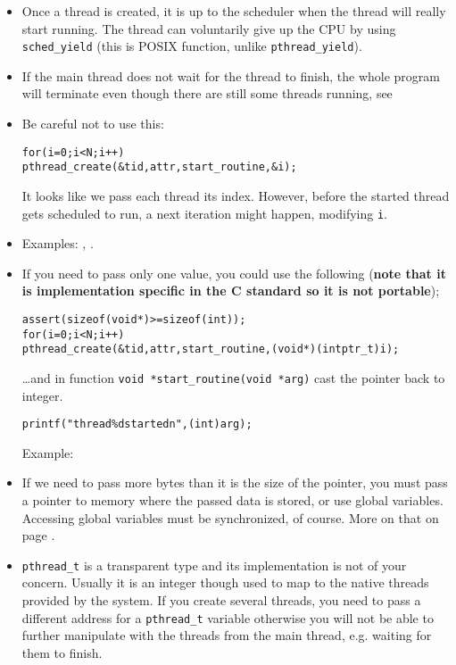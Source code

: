 \begin{itemize}
\item Once a thread is created, it is up to the scheduler when the thread
will really start running. The thread can voluntarily give up the CPU by using
\texttt{sched\_yield} (this is POSIX function, unlike \texttt{pthread\_yield}).
\item If the main thread does not wait for the thread to finish, the whole
program will terminate even though there are still some threads running,
see 
\item Be careful not to use this:
\begin{alltt}
for (i = 0; i < N; i++)
    pthread\_create(&tid, attr, start\_routine, &i);
\end{alltt}

It looks like we pass each thread its index.  However, before the started thread
gets scheduled to run, a next iteration might happen, modifying \texttt{i}.
\item \label{WRONG_USE_OF_ARG} Examples: ,
.
\item If you need to pass only one value, you could use the following
(\textbf{note that it is implementation specific in the C standard so it is not
portable});

\begin{alltt}
assert(sizeof (void *) >= sizeof (int));
for (i = 0; i < N; i++)
    pthread\_create(&tid, attr, start\_routine, (void *)(intptr\_t)i);
\end{alltt}

\dots and in function \texttt{void *start\_routine(void *arg)} cast the pointer
back to integer.

\begin{alltt}
printf("thread \%d started\bs{}n", (int)arg);
\end{alltt}

\label{INT_AS_ARG} Example: 
\item If we need to pass more bytes than it is the size of the pointer, you must
pass a pointer to memory where the passed data is stored, or use global
variables.  Accessing global variables must be synchronized, of course.  More on
that on page \pageref{THREADSYNCHRONIZATION}.
\item \label{PTHREAD_CREATE_CYCLE} \texttt{pthread\_t} is a transparent type and
its implementation is not of your concern.  Usually it is an integer though used
to map to the native threads provided by the system.  If you create several
threads, you need to pass a different address for a \texttt{pthread\_t} variable
otherwise you will not be able to further manipulate with the threads from the
main thread, e.g. waiting for them to finish.
\end{itemize}

